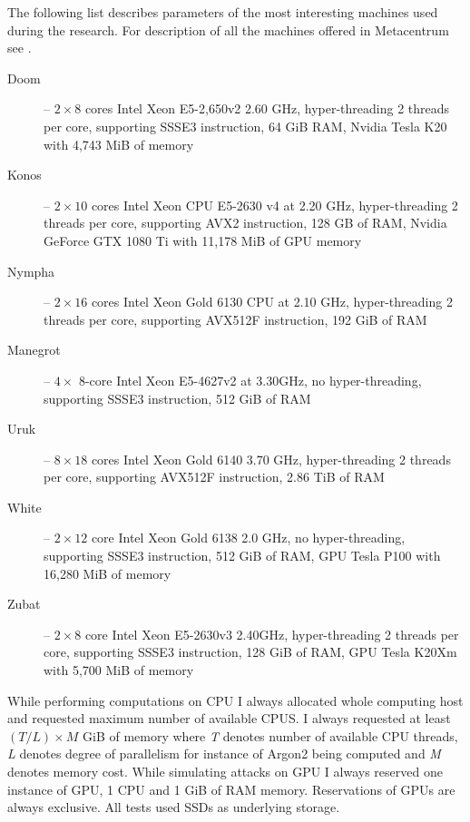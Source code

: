 \documentclass[nolof,digital]{fithesis3}
\begin{document}
The following list describes parameters of the most interesting machines used during the research. For description of all the machines offered in Metacentrum see \parencite{metacentrumhw}.

\begin{description}
\item[Doom] -- $2 \times 8$ cores Intel Xeon E5-2,650v2 2.60 GHz, hyper-threading 2 threads per core, supporting SSSE3 instruction, 64 GiB RAM, Nvidia Tesla K20 with 4,743 MiB of memory

\item[Konos] -- $2\times10$ cores Intel Xeon CPU E5-2630 v4 at 2.20 GHz, hyper-threading 2 threads per core, supporting AVX2 instruction, 128 GB of RAM, Nvidia GeForce GTX 1080 Ti with 11,178 MiB of GPU memory

\item[Nympha] -- $2\times16$ cores Intel Xeon Gold 6130 CPU at 2.10 GHz, hyper-threading 2 threads per core, supporting AVX512F instruction, 192 GiB of RAM

\item[Manegrot] -- $4\times$ 8-core Intel Xeon E5-4627v2 at 3.30GHz, no hyper-threading, supporting SSSE3 instruction, 512 GiB of RAM

\item[Uruk] -- $8\times18$ cores Intel Xeon Gold 6140  3.70 GHz, hyper-threading 2 threads per core, supporting AVX512F instruction, 2.86 TiB of RAM

\item[White] -- $2\times12$ core Intel Xeon Gold 6138 2.0 GHz, no hyper-threading, supporting SSSE3 instruction, 512 GiB of RAM, GPU Tesla P100 with 16,280 MiB of memory

\item[Zubat] -- $2\times8$ core Intel Xeon E5-2630v3 2.40GHz, hyper-threading 2 threads per core, supporting SSSE3 instruction, 128 GiB of RAM, GPU Tesla K20Xm with 5,700 MiB of memory
\end{description}

While performing computations on CPU I always allocated whole computing host and requested maximum number of available CPUS. I always requested at least $(T/L) \times M$ GiB of memory where \emph{T} denotes number of available CPU threads, \emph{L} denotes degree of parallelism for instance of Argon2 being computed and \emph{M} denotes memory cost. While simulating attacks on GPU I always reserved one instance of GPU, 1 CPU and 1 GiB of RAM memory. Reservations of GPUs are always exclusive. All tests used SSDs as underlying storage.
\end{document}
